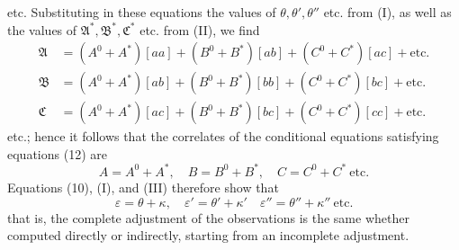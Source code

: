 etc. Substituting in these equations the values of \(\theta,\theta',\theta''\) etc. from (I), as well as the values of \(\mathfrak A^*,\mathfrak B^*,\mathfrak C^*\) etc. from (II), we find
\[
\begin{aligned}
\mathfrak A&=(A^0+A^*)[aa]+(B^0+B^*)[ab]+(C^0+C^*)[ac]+\text{etc.}\\
\mathfrak B&=(A^0+A^*)[ab]+(B^0+B^*)[bb]+(C^0+C^*)[bc]+\text{etc.}\\
\mathfrak C&=(A^0+A^*)[ac]+(B^0+B^*)[bc]+(C^0+C^*)[cc]+\text{etc.}
\end{aligned}
\]
etc.; hence it follows that the correlates of the conditional equations satisfying equations (12) are
\[
A=A^0+A^*,\quad B=B^0+B^*,\quad C=C^0+C^*\ \text{etc.}
\]
Equations (10), (I), and (III) therefore show that
\[
\varepsilon=\theta+\kappa,\quad\varepsilon'=\theta'+\kappa'\quad\varepsilon''=\theta''+\kappa''\ \text{etc.}
\]
that is, the complete adjustment of the observations is the same whether computed directly or indirectly, starting from an incomplete adjustment.